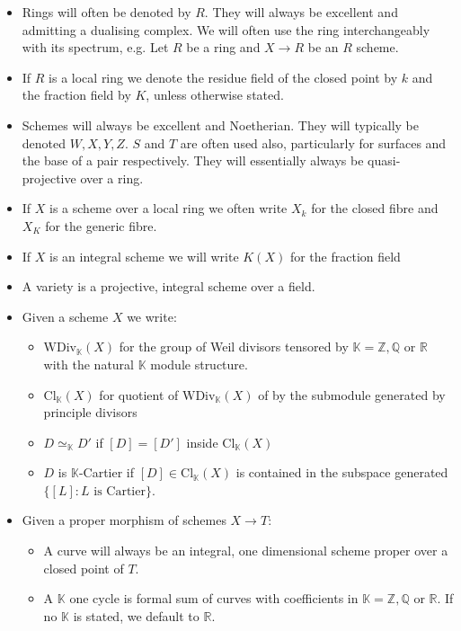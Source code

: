 \documentclass[a4paper,12pt]{book}
\begin{document}
	\begin{itemize}
		\item Rings will often be denoted by $R$. They will always be excellent and admitting a dualising complex. We will often use the ring interchangeably with its spectrum, e.g. Let $R$ be a ring and $X \to R$ be an $R$ scheme.
		\item If $R$ is a local ring we denote the residue field of the closed point by $k$ and the fraction field by $K$, unless otherwise stated.
		\item Schemes will always be excellent  and Noetherian. They will typically be denoted $W,X,Y,Z$. $S$ and $T$ are often used also, particularly for surfaces and the base of a pair respectively. They will essentially always be quasi-projective over a ring.
		\item If $X$ is a scheme over a local ring we often write $X_{k}$ for the closed fibre and $X_{K}$ for the generic fibre.
		\item If $X$ is an integral scheme we will write $K(X)$ for the fraction field
		\item A variety is a projective, integral scheme over a field.
		\item Given a scheme $X$ we write:
		\begin{itemize}
			\item $\text{WDiv}_{\mathbb{K}}(X)$ for the group of Weil divisors tensored by $\mathbb{K}=\mathbb{Z},\mathbb{Q}$ or $\mathbb{R}$ with the natural $\mathbb{K}$ module structure.
			\item $\text{Cl}_{\mathbb{K}}(X)$ for quotient of $\text{WDiv}_{\mathbb{K}}(X)$ of by the submodule generated by principle divisors
			\item $D \simeq_{\mathbb{K}}D'$ if $[D] = [D']$ inside $\text{Cl}_{\mathbb{K}}(X)$
			\item $D$ is $\mathbb{K}$-Cartier if $[D] \in \text{Cl}_{\mathbb{K}}(X)$ is contained in the subspace generated $\{[L] \colon L \text{ is Cartier}\}$.
		\end{itemize}
		\item Given a proper morphism of schemes $X \to T$:
		\begin{itemize}
			\item A curve will always be an integral, one dimensional scheme proper over a closed point of $T$.
			\item A $\mathbb{K}$ one cycle is formal sum of curves with coefficients in $\mathbb{K}=\mathbb{Z},\mathbb{Q}$ or $\mathbb{R}$. If no $\mathbb{K}$ is stated, we default to $\mathbb{R}$.

\end{itemize}
\end{itemize}
\end{document}
